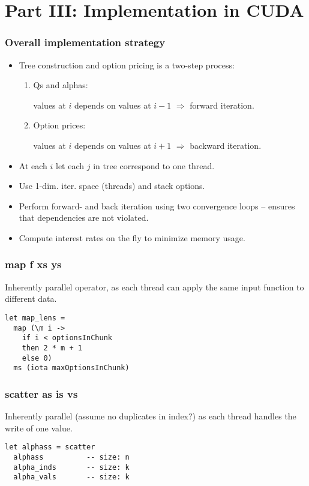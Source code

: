 \section{Part III: Implementation in CUDA}

\begin{frame}
  \frametitle{Overall implementation strategy}
  \begin{itemize}
    \item Tree construction and option pricing is a two-step
      process:
      \begin{enumerate}
      \item Qs and alphas:

        values at $i$ depends on values at $i-1$
        $\Rightarrow$ forward iteration.
      \item Option prices:

        values at $i$ depends on values at $i+1$
        $\Rightarrow$ backward iteration.
      \end{enumerate}
    \item At each $i$ let each $j$ in tree correspond to one
      thread.
    \item Use 1-dim. iter. space (threads) and stack
      options.
    \item Perform forward- and back iteration using two
      convergence loops -- ensures that dependencies are not
      violated.
    \item Compute interest rates on the fly to minimize
      memory usage.
  \end{itemize}
\end{frame}


\begin{frame}[fragile]
  \frametitle{map f xs ys}
%
Inherently parallel operator, as each thread can apply the same input
function to different data.
%
\begin{lstlisting}
let map_lens =
  map (\m i ->
    if i < optionsInChunk
    then 2 * m + 1
    else 0)
  ms (iota maxOptionsInChunk)
\end{lstlisting}
%
\end{frame}

\begin{frame}[fragile]
  \frametitle{scatter as is vs}
%
Inherently parallel (assume no duplicates in index?) as each thread
handles the write of one value.
%
%
\begin{lstlisting}
let alphass = scatter
  alphass          -- size: n
  alpha_inds       -- size: k
  alpha_vals       -- size: k
\end{lstlisting}
%
\end{frame}

